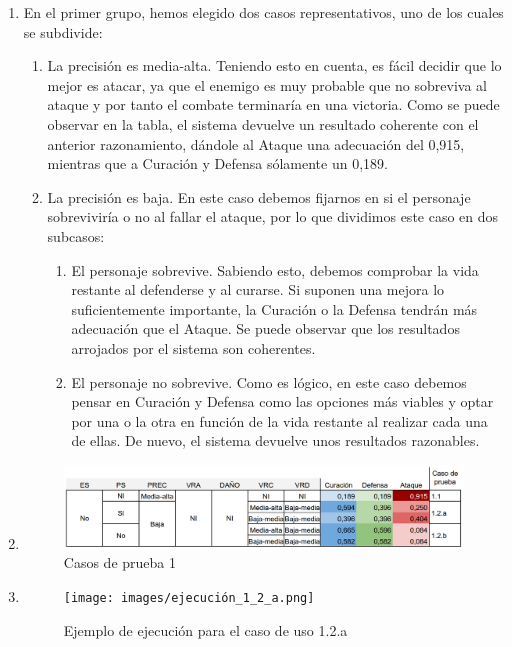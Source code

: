 \begin{enumerate}

	\item En el primer grupo, hemos elegido dos casos representativos, uno de los cuales se subdivide:
	\begin{enumerate}[label={1.\arabic*.}]
		\item La precisión es media-alta. Teniendo esto en cuenta, es fácil decidir que lo mejor es atacar, ya que el enemigo es muy probable que no sobreviva al ataque y por tanto el combate terminaría en una victoria. Como se puede observar en la tabla, el sistema devuelve un resultado coherente con el anterior razonamiento, dándole al Ataque una adecuación del 0,915, mientras que a Curación y Defensa sólamente un 0,189.
		\item La precisión es baja. En este caso debemos fijarnos en si el personaje sobreviviría o no al fallar el ataque, por lo que dividimos este caso en dos subcasos:
		\begin{enumerate}[label=\alph*)]
			\item El personaje sobrevive. Sabiendo esto, debemos comprobar la vida restante al defenderse y al curarse. Si suponen una mejora lo suficientemente importante, la Curación o la Defensa tendrán más adecuación que el Ataque. Se puede observar que los resultados arrojados por el sistema son coherentes.
			\item El personaje no sobrevive. Como es lógico, en este caso debemos pensar en Curación y Defensa como las opciones más viables y optar por una o la otra en función de la vida restante al realizar cada una de ellas. De nuevo, el sistema devuelve unos resultados razonables.
		\end{enumerate}
	\end{enumerate}
\item[] \begin{figure}[H]
	\centering
	\includegraphics[width=\textwidth,height=\textheight,keepaspectratio]{images/casos_pruebas.png}
	\caption{Casos de prueba 1}
	\label{fig:casos_prueba1}
\end{figure}

\item[] \begin{figure}[H]
	\centering
	\texttt{[image: images/ejecución\_1\_2\_a.png]}
	\caption{Ejemplo de ejecución para el caso de uso 1.2.a}
	\label{fig:casos_prueba1}
\end{figure}


\end{enumerate}
